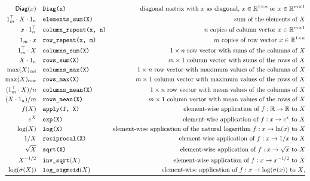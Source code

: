 \documentclass[twoside,11pt]{article}
\newcommand{\func}[1]{\ensuremath{\textsf{#1}}} %
\newcommand{\Reals}{\mathbb{R}}
\begin{document}
\begin{table}[thbp]
{\begin{align*}
    \\
    \func{Diag}(x) &\quad \texttt{Diag(x)} &\quad \text{diagonal matrix with $x$ as diagonal, } x \in \Reals^{1 \times n} \text{ or } x \in \Reals^{m \times 1} 
    \\
    1_m^\top \cdot X \cdot 1_n &\quad \texttt{elements\_sum(X)} & \text{sum of the elements of $X$}
    \\
    x \cdot 1_n^\top &\quad \texttt{column\_repeat(x, n)} & \text{$n$ copies of column vector $x \in \Reals^{m \times 1}$} 
    \\
    1_m \cdot x &\quad \texttt{row\_repeat(x, m)} & \text{$m$ copies of row vector $x \in \Reals^{1 \times n}$}
    \\
    1_m^\top \cdot X &\quad \texttt{columns\_sum(X)} & \text{$1 \times n$ row vector with sums of the columns of $X$}
    \\
    X \cdot 1_n &\quad \texttt{rows\_sum(X)} & \text{$m \times 1$ column vector with sums of the rows of $X$} 
    \\
    \max(X)_\text{col} &\quad \texttt{columns\_max(X)} & \text{$1 \times n$ row vector with maximum values of the columns of $X$}
    \\
    \max(X)_\text{row} &\quad \texttt{rows\_max(X)} & \text{$m \times 1$ column vector with maximum values of the rows of $X$}
    \\
    (1_m^\top \cdot X) / n &\quad \texttt{columns\_mean(X)} & \text{$1 \times n$ row vector with mean values of the columns of $X$}
    \\
    (X \cdot 1_n) / m &\quad \texttt{rows\_mean(X)} & \text{$m \times 1$ column vector with mean values of the rows of $X$}
    \\
    f(X) &\quad \texttt{apply(f, X)} & \text{element-wise application of $f: \Reals \rightarrow \Reals$ to $X$} 
    \\
    e^X &\quad \texttt{exp(X)} & \text{element-wise application of $f: x \rightarrow e^x$ to $X$} 
    \\
    \log(X) &\quad \texttt{log(X)} & \text{element-wise application of the natural logarithm $f: x \rightarrow \ln(x)$ to $X$}
    \\
    1 / X &\quad \texttt{reciprocal(X)} & \text{element-wise application of $f: x \rightarrow 1/x$ to $X$}
    \\
    \sqrt{X} &\quad \texttt{sqrt(X)} & \text{element-wise application of $f: x \rightarrow \sqrt{x}$ to $X$}
    \\ X^{-1/2} &\quad \texttt{inv\_sqrt}(X) & \text{element-wise application of $f: x \rightarrow x^{-1/2}$ to $X$} 
    \\
    \log(\sigma(X)) &\quad \texttt{log\_sigmoid}(X) & \text{element-wise application of $f: x \rightarrow \log(\sigma(x))$ to $X$},
    \\
    \bottomrule
\end{align*}
}
\end{table}
\end{document}

